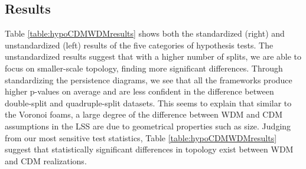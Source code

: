\documentclass[12pt]{article}
\begin{document}
\subsection{Results}
Table \ref{table:hypoCDMWDMresults} shows both the standardized (right) and unstandardized (left) results of the five categories of hypothesis tests. The unstandardized results suggest that with a higher number of splits, we are able to focus on smaller-scale topology, finding more significant differences. Through standardizing the persistence diagrams, we see that all the frameworks produce higher p-values on average and are less confident in the difference between double-split and quadruple-split datasets. This seems to explain that similar to the Voronoi foams, a large degree of the difference between WDM and CDM assumptions in the LSS are due to geometrical properties such as size. Judging from our most sensitive test statistics, Table \ref{table:hypoCDMWDMresults} suggest that statistically significant differences in topology exist between WDM and CDM realizations.
\end{document}
